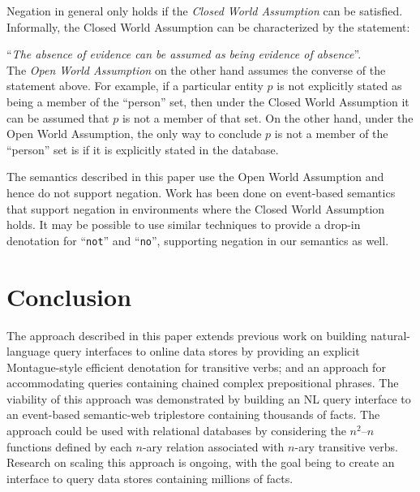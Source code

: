\documentclass[../main.tex]{subfiles}
\begin{document}
\begin{refsection}
Negation in general only holds if the \textit{Closed World Assumption} can be satisfied.  Informally, the Closed World Assumption can be characterized by the statement:

{\hfil ``\textit{The absence of evidence can be assumed as being evidence of absence}''. \hfil} \\
The \textit{Open World Assumption} on the other hand assumes the converse of the statement above.
For example, if a particular entity $p$ is not explicitly stated as being a member of the ``person'' set, then under the Closed World Assumption it can be assumed that $p$ is not a member of that set.  On the other hand, under the Open World Assumption, the only way to conclude $p$ is not a member of the ``person'' set is if it is explicitly stated in the database.

The semantics described in this paper use the Open World Assumption and hence do not support negation.
Work has been done on event-based semantics that support negation \cite{champollion2010quantification} in environments where the Closed World Assumption holds. It may be possible to use similar techniques to provide a drop-in denotation for ``\texttt{not}'' and ``\texttt{no}'', supporting negation in our semantics as well.


\section{Conclusion}
The approach described in this paper extends previous work on building natural-language query interfaces to online data stores by providing an explicit Montague-style efficient denotation for transitive verbs; and an approach for accommodating queries containing chained complex prepositional phrases. The viability of this approach was demonstrated by building an NL query interface to an event-based semantic-web triplestore containing thousands of facts. The approach could be used with relational databases by considering the $n^2 – n$ functions defined by each $n$-ary relation associated with $n$-ary transitive verbs. Research on scaling this approach is ongoing, with the goal being to create an interface to query data stores containing millions of facts.







\end{refsection}
\end{document}
